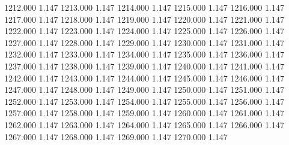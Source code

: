 1212.000 1.147 
1213.000 1.147 
1214.000 1.147 
1215.000 1.147 
1216.000 1.147 
1217.000 1.147 
1218.000 1.147 
1219.000 1.147 
1220.000 1.147 
1221.000 1.147 
1222.000 1.147 
1223.000 1.147 
1224.000 1.147 
1225.000 1.147 
1226.000 1.147 
1227.000 1.147 
1228.000 1.147 
1229.000 1.147 
1230.000 1.147 
1231.000 1.147 
1232.000 1.147 
1233.000 1.147 
1234.000 1.147 
1235.000 1.147 
1236.000 1.147 
1237.000 1.147 
1238.000 1.147 
1239.000 1.147 
1240.000 1.147 
1241.000 1.147 
1242.000 1.147 
1243.000 1.147 
1244.000 1.147 
1245.000 1.147 
1246.000 1.147 
1247.000 1.147 
1248.000 1.147 
1249.000 1.147 
1250.000 1.147 
1251.000 1.147 
1252.000 1.147 
1253.000 1.147 
1254.000 1.147 
1255.000 1.147 
1256.000 1.147 
1257.000 1.147 
1258.000 1.147 
1259.000 1.147 
1260.000 1.147 
1261.000 1.147 
1262.000 1.147 
1263.000 1.147 
1264.000 1.147 
1265.000 1.147 
1266.000 1.147 
1267.000 1.147 
1268.000 1.147 
1269.000 1.147 
1270.000 1.147 
